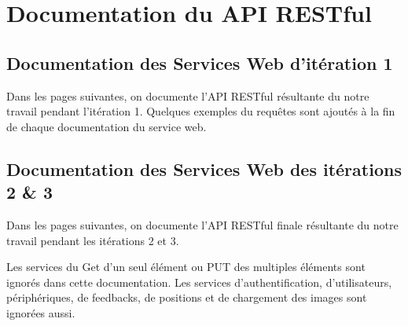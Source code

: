 \chapter{Documentation du API RESTful}

\setlength{\aboverulesep}{0pt}
\setlength{\belowrulesep}{0pt}

\section{Documentation des Services Web d'itération 1}

Dans les pages suivantes, on documente l'API RESTful résultante du notre
travail pendant l'itération 1. Quelques exemples du requêtes sont ajoutés à la
fin de chaque documentation du service web.

\clearpage

\clearpage


\clearpage
\section{Documentation des Services Web des itérations 2 \& 3}

Dans les pages suivantes, on documente l'API RESTful finale résultante du notre
travail pendant les itérations 2 et 3.

Les services du Get d'un seul élément ou PUT des multiples éléments sont
ignorés dans cette documentation. Les services d'authentification,
d'utilisateurs, périphériques, de feedbacks, de positions et de chargement des
images sont ignorées aussi.










